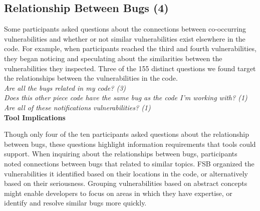\documentclass[conference]{IEEEtran}
\begin{document}

\noindent\subsection{\textbf{Relationship Between Bugs (4)}}\label{rbb}

Some participants asked questions about the connections between co-occurring vulnerabilities and whether or not similar vulnerabilities exist elsewhere in the code. 
For example, when participants reached the third and fourth vulnerabilities, they began noticing and speculating about the similarities between the vulnerabilities they inspected.
Three of the 155 distinct questions we found target the relationships between the vulnerabilities in the code. 
\\

\noindent\emph{Are all the bugs related in my code? (3)} \\
\emph{Does this other piece code have the same bug as the code I'm working with? (1)} \\
\emph{Are all of these notifications vulnerabilities? (1)} \\



\noindent\textbf{Tool Implications}

Though only four of the ten participants asked questions about the relationship between bugs, these questions highlight information requirements that tools could support.
When inquiring about the relationships between bugs, participants noted connections between bugs that related to similar topics.
FSB organized the vulnerabilities it identified based on their locations in the code, or alternatively based on their seriousness.
Grouping vulnerabilities based on abstract concepts might enable developers to focus on areas in which they have expertise, or identify and resolve similar bugs more quickly.

\end{document}
